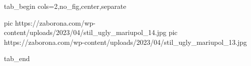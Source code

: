  
 
 
 
 


\ifcmt
  tab_begin cols=2,no_fig,center,separate

     pic https://zaborona.com/wp-content/uploads/2023/04/stil_ugly_mariupol_14.jpg
     pic https://zaborona.com/wp-content/uploads/2023/04/stil_ugly_mariupol_13.jpg

  tab_end
\fi
